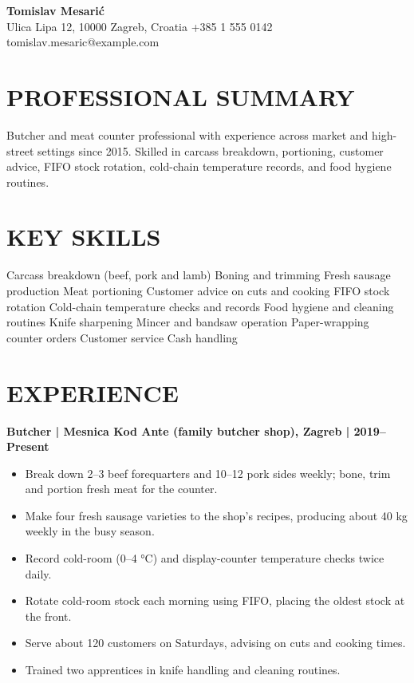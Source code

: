 \documentclass[11pt,a4paper]{article}
\begin{document}
\begin{center}
{\Huge\bfseries\color{primarycolor} Tomislav Mesarić}\\[0.4em]
{\small Ulica Lipa 12, 10000 Zagreb, Croatia \textbar{} +385 1 555 0142 \textbar{} tomislav.mesaric@example.com}
\end{center}
\vspace{0.4em}

\section*{PROFESSIONAL SUMMARY}
Butcher and meat counter professional with experience across market and high-street settings since 2015. Skilled in carcass breakdown, portioning, customer advice, FIFO stock rotation, cold-chain temperature records, and food hygiene routines.

\section*{KEY SKILLS}
Carcass breakdown (beef, pork and lamb) \textbar{} Boning and trimming \textbar{} Fresh sausage production \textbar{} Meat portioning \textbar{} Customer advice on cuts and cooking \textbar{} FIFO stock rotation \textbar{} Cold-chain temperature checks and records \textbar{} Food hygiene and cleaning routines \textbar{} Knife sharpening \textbar{} Mincer and bandsaw operation \textbar{} Paper-wrapping counter orders \textbar{} Customer service \textbar{} Cash handling

\section*{EXPERIENCE}
\textbf{Butcher | Mesnica Kod Ante (family butcher shop), Zagreb | 2019–Present}
\begin{itemize}
\item Break down 2–3 beef forequarters and 10–12 pork sides weekly; bone, trim and portion fresh meat for the counter.
\item Make four fresh sausage varieties to the shop's recipes, producing about 40 kg weekly in the busy season.
\item Record cold-room (0–4 °C) and display-counter temperature checks twice daily.
\item Rotate cold-room stock each morning using FIFO, placing the oldest stock at the front.
\item Serve about 120 customers on Saturdays, advising on cuts and cooking times.
\item Trained two apprentices in knife handling and cleaning routines.
\end{itemize}
\end{document}
